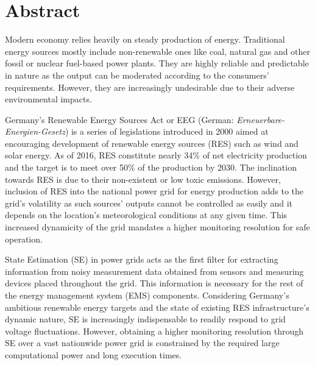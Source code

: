 \documentclass[thesis.tex]{subfiles}
\begin{document}
\chapter*{Abstract}

Modern economy relies heavily on steady production of energy. Traditional energy sources mostly include non-renewable ones like coal, natural gas and other fossil or nuclear fuel-based power plants. They are highly reliable and predictable in nature as the output can be moderated according to the consumers' requirements. However, they are increasingly undesirable due to their adverse environmental impacts. 

Germany's Renewable Energy Sources Act or EEG (German: \textit{Erneuerbare-Energien-Gesetz}) is a series of legislations introduced in 2000 aimed at encouraging development of renewable energy sources (RES) such as wind and solar energy. As of 2016, RES constitute nearly 34\% of net electricity production and the target is to meet over 50\% of the production by 2030. The inclination towards RES is due to their non-existent or low toxic emissions. However, inclusion of RES into the national power grid for energy production adds to the grid's volatility as such sources' outputs cannot be controlled as easily and it depends on the location's meteorological conditions at any given time. This increased dynamicity of the grid mandates a higher monitoring resolution for safe operation.

State Estimation (SE) in power grids acts as the first filter for extracting information from noisy measurement data obtained from sensors and measuring devices placed throughout the grid. This information is necessary for the rest of the energy management system (EMS) components. Considering Germany's ambitious renewable energy targets and the state of existing RES infrastructure's dynamic nature, SE is increasingly indispensable to readily respond to grid voltage fluctuations. However, obtaining a higher monitoring resolution through SE over a vast nationwide power grid is constrained by the required large computational power and long execution times.
\end{document}
